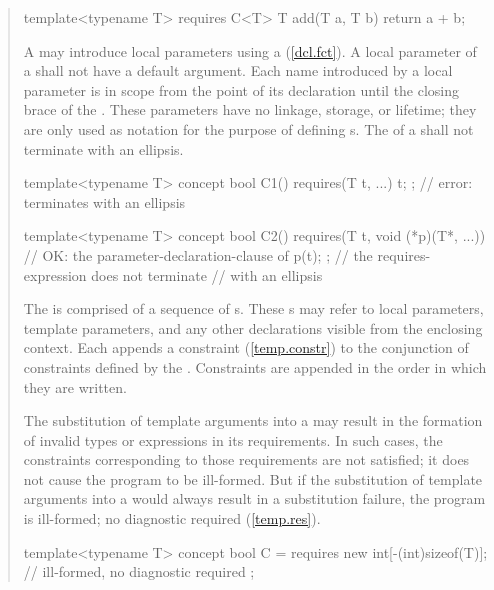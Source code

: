 \begin{quote}
\begin{codeblock}
template<typename T> requires C<T> 
  T add(T a, T b) { return a + b; }
\end{codeblock}
\exitnote

\pnum
A  may introduce local parameters using a
(\ref{dcl.fct}). 
%
A local parameter of a  shall not have a 
default argument.
%
Each name introduced by a local parameter is in scope from the point
of its declaration until the closing brace of the
.
%
These parameters have no linkage, storage, or lifetime; they are only used
as notation for the purpose of defining s.
%
The  of a 
 shall
not terminate with an ellipsis.
\enterexample
\begin{codeblock}
template<typename T>
  concept bool C1() { 
    requires(T t, ...) { t; }; // error: terminates with an ellipsis
  }

template<typename T>
  concept bool C2() { 
    requires(T t, void (*p)(T*, ...)) // OK: the parameter-declaration-clause of
    { p(t); };                        // the requires-expression does not terminate 
  }                                   // with an ellipsis
\end{codeblock}
\exitexample

\pnum
The  is comprised of 
a sequence of s.
%
These s may refer to local 
parameters, template parameters, and any other declarations visible from the 
enclosing context. 
%
Each  appends a constraint (\ref{temp.constr}) to 
the conjunction of constraints defined by the
. Constraints are appended in the order
in which they are written.

\pnum
The substitution of template arguments into a  
may result in the formation of invalid types or expressions in its
requirements. In such cases, the constraints corresponding to those
requirements are not satisfied; it does not cause the program to be ill-formed.
%
\enternote
But if the substitution of template arguments into
a  would always result in
a substitution failure, the program is ill-formed; no diagnostic
required (\ref{temp.res}).
\exitnote
%
\enterexample
\begin{codeblock}
template<typename T> concept bool C =
  requires {
    new int[-(int)sizeof(T)]; // ill-formed, no diagnostic required
  };
\end{codeblock}
\exitexample



\end{quote}
